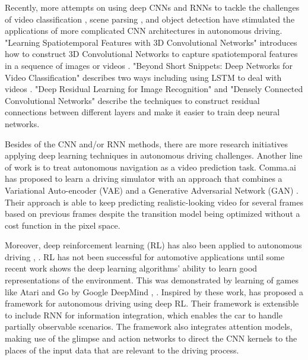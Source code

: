 \documentclass[10pt,twocolumn,letterpaper]{article}
\begin{document}
Recently, more attempts on using deep CNNs and RNNs to tackle the challenges of video classification \cite{karpathy2014large}, scene parsing \cite{farabet2013learning}, and object detection \cite{szegedy2013deep} have stimulated the applications of more complicated CNN architectures in autonomous driving. "Learning Spatiotemporal Features with 3D Convolutional Networks" introduces how to construct 3D Convolutional Networks to capture spatiotemporal features in a sequence of images or videos \cite{Tran_2015_ICCV}. "Beyond Short Snippets: Deep Networks for Video Classification" describes two ways including using LSTM to deal with videos \cite{yue2015beyond}. "Deep Residual Learning for Image Recognition" \cite{he2016deep} and "Densely Connected Convolutional Networks" \cite{huang2016densely} describe the techniques to construct residual connections between different layers and make it easier to train deep neural networks.

Besides of the CNN and/or RNN methods, there are more research initiatives applying deep learning techniques in autonomous driving challenges. Another line of work is to treat autonomous navigation as a video prediction task. Comma.ai \cite{santana2016learning} has proposed to learn a driving simulator with an approach that combines a Variational Auto-encoder (VAE) \cite{kingma2013auto} and a Generative Adversarial Network (GAN) \cite{goodfellow2014generative}. Their approach is able to keep predicting realistic-looking video for several frames based on previous frames despite the transition model being optimized without a cost function in the pixel space. 

Moreover, deep reinforcement learning (RL) has also been applied to autonomous driving \cite{el2017deep}, \cite{shalev2016safe}. RL has not been successful for automotive applications until some recent work shows the deep learning algorithms’ ability to learn good representations of the environment. This was demonstrated by learning of games like Atari and Go by Google DeepMind \cite{mnih2013playing}, \cite{silver2016mastering}. Inspired by these work, \cite{el2017deep} has proposed a framework for autonomous driving using deep RL. Their framework is extensible to include RNN for information integration, which enables the car to handle partially observable scenarios. The framework also integrates attention models,  making use of the glimpse and action networks to direct the CNN kernels to the places of the input data that are relevant to the driving process.
\end{document}
